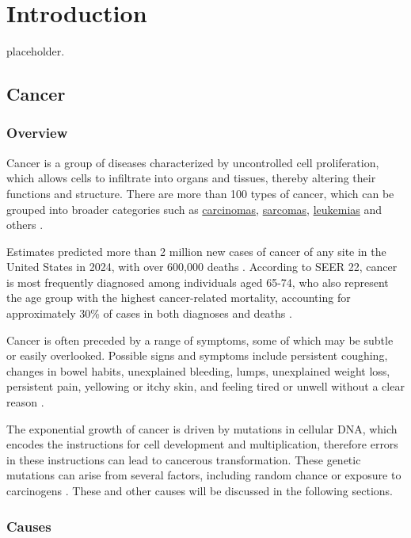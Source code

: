 \chapter{Introduction} \label{chap:introduction}

placeholder. 

\section{Cancer}

\subsection{Overview}

Cancer is a group of diseases characterized by uncontrolled cell proliferation, which allows cells to infiltrate into organs and tissues, thereby altering their functions and structure. There are more than 100 types of cancer, which can be grouped into broader categories such as \href{https://en.wikipedia.org/wiki/Carcinoma}{carcinomas}, \href{https://en.wikipedia.org/wiki/Sarcoma}{sarcomas}, \href{https://en.wikipedia.org/wiki/Leukemia}{leukemias} and others \cite{cancer1}.

Estimates predicted more than 2 million new cases of cancer of any site in the United States in 2024, with over 600,000 deaths \cite{cancer4}. According to SEER \cite{seer} 22, cancer is most frequently diagnosed among individuals aged 65-74, who also represent the age group with the highest cancer-related mortality, accounting for approximately 30\% of cases in both diagnoses and deaths \cite{cancer5}.

Cancer is often preceded by a range of symptoms, some of which may be subtle or easily overlooked. Possible signs and symptoms include persistent coughing, changes in bowel habits, unexplained bleeding, lumps, unexplained weight loss, persistent pain, yellowing or itchy skin, and feeling tired or unwell without a clear reason \cite{cancer3}.

The exponential growth of cancer is driven by mutations in cellular DNA, which encodes the instructions for cell development and multiplication, therefore errors in these instructions can lead to cancerous transformation. These genetic mutations can arise from several factors, including random chance or exposure to carcinogens \cite{cancer2}. These and other causes will be discussed in the following sections.

\subsection{Causes}

